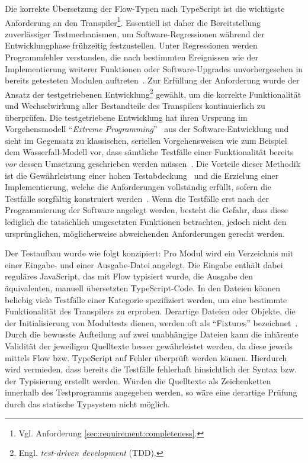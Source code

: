 Die korrekte Übersetzung der Flow-Typen nach TypeScript ist die wichtigste Anforderung an den Transpiler\footnote{Vgl. Anforderung \ref{sec:requirement:completeness}.}. Essentiell ist daher die Bereitstellung zuverlässiger Testmechanismen, um Software-Regressionen während der Entwicklungphase frühzeitig festzustellen. Unter Regressionen werden Programmfehler verstanden, die nach bestimmten Ereignissen wie der Implementierung weiterer Funktionen oder Software-Upgrades unvorhergesehen in bereits getesteten Modulen auftreten~\autocite[218]{DOR:SOFTWARE_TEST}. Zur Erfüllung der Anforderung wurde der Ansatz der testgetriebenen Entwicklung\footnote{Engl. \textit{test-driven development} (TDD).} gewählt, um die korrekte Funktionalität und Wechselwirkung aller Bestandteile des Transpilers kontinuierlich zu überprüfen. Die testgetriebene Entwicklung hat ihren Ursprung im Vorgehensmodell \enquote{\textit{Extreme Programming}}~\autocite{JEFFRIES:EXTREME_PROGRAMMING} aus der Software-Entwicklung und sieht im Gegensatz zu klassischen, seriellen Vorgehensweisen wie zum Beispiel dem Wasserfall-Modell vor, dass sämtliche Testfälle einer Funktionalität bereits \emph{vor} dessen Umsetzung geschrieben werden müssen~\autocite{BECK:EXTREME_PROGRAMMING}. Die Vorteile dieser Methodik ist die Gewährleistung einer hohen Testabdeckung~\autocite[90]{BECK:TDD} und die Erzielung einer Implementierung, welche die Anforderungen vollständig erfüllt, sofern die Testfälle sorgfältig konstruiert werden~\autocite[214]{BECK:TDD}. Wenn die Testfälle erst nach der Programmierung der Software angelegt werden, besteht die Gefahr, dass diese lediglich die tatsächlich umgesetzten Funktionen betrachten, jedoch nicht den ursprünglichen, möglicherweise abweichenden Anforderungen gerecht werden.

Der Testaufbau wurde wie folgt konzipiert: Pro Modul wird ein Verzeichnis mit einer Ein\-gabe- und einer Ausgabe-Datei angelegt. Die Eingabe enthält dabei reguläres JavaScript, das mit Flow typisiert wurde, die Ausgabe den äquivalenten, manuell übersetzten TypeScript-Code. In den Dateien können beliebig viele Testfälle einer Kategorie spezifiziert werden, um eine bestimmte Funktionalität des Transpilers zu erproben. Derartige Dateien oder Objekte, die der Initialisierung von Modultests dienen, werden oft als \enquote{Fixtures} bezeichnet~\autocite{OLAN:2003}. Durch die bewusste Aufteilung auf zwei unabhängige Dateien kann die inhärente Validität der jeweiligen Quelltexte besser gewährleistet werden, da diese jeweils mittels Flow bzw. TypeScript auf Fehler überprüft werden können. Hierdurch wird vermieden, dass bereits die Testfälle fehlerhaft hinsichtlich der Syntax bzw. der Typisierung erstellt werden. Würden die Quelltexte als Zeichenketten innerhalb des Testprogramms angegeben werden, so wäre eine derartige Prüfung durch das statische Typsystem nicht möglich.

